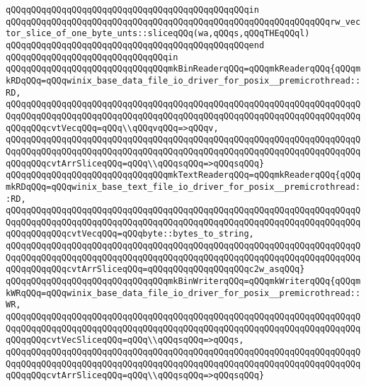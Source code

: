 \verb|qQQqqQQqqQQqqQQqqQQqqQQqqQQqqQQqqQQqqQQqqQQqqQQqin|\newline
\verb|qQQqqQQqqQQqqQQqqQQqqQQqqQQqqQQqqQQqqQQqqQQqqQQqqQQqqQQqqQQqqQQqrw_vector_slice_of_one_byte_unts::sliceqQQq(wa,qQQqs,qQQqTHEqQQql)|\newline
\verb|qQQqqQQqqQQqqQQqqQQqqQQqqQQqqQQqqQQqqQQqqQQqqQQqend|\newline
\verb|qQQqqQQqqQQqqQQqqQQqqQQqqQQqqQQqin|\newline
\newline
\verb|qQQqqQQqqQQqqQQqqQQqqQQqqQQqqQQqmkBinReaderqQQq=qQQqmkReaderqQQq{qQQqmkRDqQQq=qQQqwinix_base_data_file_io_driver_for_posix__premicrothread::RD,|\newline
\verb|qQQqqQQqqQQqqQQqqQQqqQQqqQQqqQQqqQQqqQQqqQQqqQQqqQQqqQQqqQQqqQQqqQQqqQQqqQQqqQQqqQQqqQQqqQQqqQQqqQQqqQQqqQQqqQQqqQQqqQQqqQQqqQQqqQQqqQQqqQQqqQQqqQQqcvtVecqQQq=qQQq\\qQQqvqQQq=>qQQqv,|\newline
\verb|qQQqqQQqqQQqqQQqqQQqqQQqqQQqqQQqqQQqqQQqqQQqqQQqqQQqqQQqqQQqqQQqqQQqqQQqqQQqqQQqqQQqqQQqqQQqqQQqqQQqqQQqqQQqqQQqqQQqqQQqqQQqqQQqqQQqqQQqqQQqqQQqqQQqcvtArrSliceqQQq=qQQq\\qQQqsqQQq=>qQQqsqQQq}|\newline
\newline
\verb|qQQqqQQqqQQqqQQqqQQqqQQqqQQqqQQqmkTextReaderqQQq=qQQqmkReaderqQQq{qQQqmkRDqQQq=qQQqwinix_base_text_file_io_driver_for_posix__premicrothread::RD,|\newline
\verb|qQQqqQQqqQQqqQQqqQQqqQQqqQQqqQQqqQQqqQQqqQQqqQQqqQQqqQQqqQQqqQQqqQQqqQQqqQQqqQQqqQQqqQQqqQQqqQQqqQQqqQQqqQQqqQQqqQQqqQQqqQQqqQQqqQQqqQQqqQQqqQQqqQQqqQQqcvtVecqQQq=qQQqbyte::bytes_to_string,|\newline
\verb|qQQqqQQqqQQqqQQqqQQqqQQqqQQqqQQqqQQqqQQqqQQqqQQqqQQqqQQqqQQqqQQqqQQqqQQqqQQqqQQqqQQqqQQqqQQqqQQqqQQqqQQqqQQqqQQqqQQqqQQqqQQqqQQqqQQqqQQqqQQqqQQqqQQqqQQqcvtArrSliceqQQq=qQQqqQQqqQQqqQQqqQQqc2w_asqQQq}|\newline
\newline
\verb|qQQqqQQqqQQqqQQqqQQqqQQqqQQqqQQqmkBinWriterqQQq=qQQqmkWriterqQQq{qQQqmkWRqQQq=qQQqwinix_base_data_file_io_driver_for_posix__premicrothread::WR,|\newline
\verb|qQQqqQQqqQQqqQQqqQQqqQQqqQQqqQQqqQQqqQQqqQQqqQQqqQQqqQQqqQQqqQQqqQQqqQQqqQQqqQQqqQQqqQQqqQQqqQQqqQQqqQQqqQQqqQQqqQQqqQQqqQQqqQQqqQQqqQQqqQQqqQQqqQQqcvtVecSliceqQQq=qQQq\\qQQqsqQQq=>qQQqs,|\newline
\verb|qQQqqQQqqQQqqQQqqQQqqQQqqQQqqQQqqQQqqQQqqQQqqQQqqQQqqQQqqQQqqQQqqQQqqQQqqQQqqQQqqQQqqQQqqQQqqQQqqQQqqQQqqQQqqQQqqQQqqQQqqQQqqQQqqQQqqQQqqQQqqQQqqQQqcvtArrSliceqQQq=qQQq\\qQQqsqQQq=>qQQqsqQQq}|\newline
